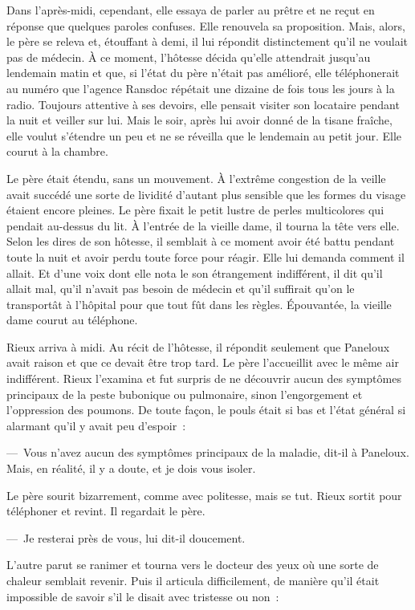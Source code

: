\documentclass[french,twoside]{book} %
\begin{document}
Dans l’après-midi, cependant, elle essaya de parler au prêtre et ne reçut en réponse que quelques paroles confuses. Elle renouvela sa proposition. Mais, alors, le père se releva et, étouffant à demi, il lui répondit distinctement qu’il ne voulait pas de médecin. À ce moment, l’hôtesse décida qu’elle attendrait jusqu’au lendemain matin et que, si l’état du père n’était pas amélioré, elle téléphonerait au numéro que l’agence Ransdoc répétait une dizaine de fois tous les jours à la radio. Toujours attentive à ses devoirs, elle pensait visiter son locataire pendant la nuit et veiller sur lui. Mais le soir, après lui avoir donné de la tisane fraîche, elle voulut s’étendre un peu et ne se réveilla que le lendemain au petit jour. Elle courut à la chambre.\par
Le père était étendu, sans un mouvement. À l’extrême congestion de la veille avait succédé une sorte de lividité d’autant plus sensible que les formes du visage étaient encore pleines. Le père fixait le petit lustre de perles multicolores qui pendait au-dessus du lit. À l’entrée de la vieille dame, il tourna la tête vers elle. Selon les dires de son hôtesse, il semblait à ce moment avoir été battu pendant toute la nuit et avoir perdu toute force pour réagir. Elle lui demanda comment il allait. Et d’une voix dont elle nota le son étrangement indifférent, il dit qu’il allait mal, qu’il n’avait pas besoin de médecin et qu’il suffirait qu’on le transportât à l’hôpital pour que tout fût dans les règles. Épouvantée, la vieille dame courut au téléphone.\par
Rieux arriva à midi. Au récit de l’hôtesse, il répondit seulement que Paneloux avait raison et que ce devait être trop tard. Le père l’accueillit avec le même air indifférent. Rieux l’examina et fut surpris de ne découvrir aucun des symptômes principaux de la peste bubonique ou pulmonaire, sinon l’engorgement et l’oppression des poumons. De toute façon, le pouls était si bas et l’état général si alarmant qu’il y avait peu d’espoir :\par
— Vous n’avez aucun des symptômes principaux de la maladie, dit-il à Paneloux. Mais, en réalité, il y a doute, et je dois vous isoler.\par
Le père sourit bizarrement, comme avec politesse, mais se tut. Rieux sortit pour téléphoner et revint. Il regardait le père.\par
— Je resterai près de vous, lui dit-il doucement.\par
L’autre parut se ranimer et tourna vers le docteur des yeux où une sorte de chaleur semblait revenir. Puis il articula difficilement, de manière qu’il était impossible de savoir s’il le disait avec tristesse ou non :\par
\end{document}
